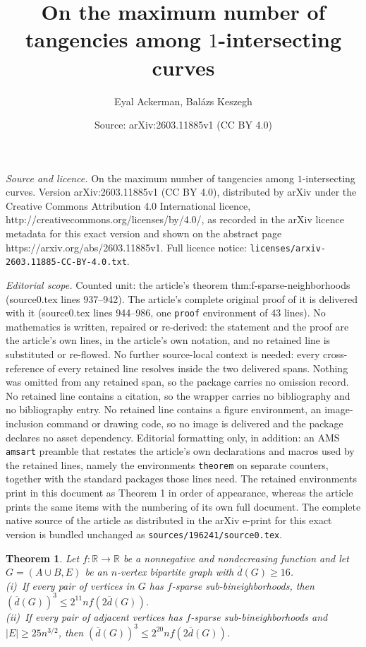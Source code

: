 \documentclass[10pt,a4paper]{amsart}
\title{On the maximum number of tangencies among $1$-intersecting curves}
\author{Eyal Ackerman, Bal\'azs Keszegh}
\date{Source: arXiv:2603.11885v1 (CC BY 4.0)}
\newtheorem{theorem}{Theorem}
\begin{document}
\maketitle

\noindent\emph{Source and licence.} On the maximum number of tangencies among $1$-intersecting curves. Version arXiv:2603.11885v1 (CC BY 4.0), distributed by arXiv under the Creative Commons Attribution 4.0 International licence, http://creativecommons.org/licenses/by/4.0/, as recorded in the arXiv licence metadata for this exact version and shown on the abstract page https://arxiv.org/abs/2603.11885v1. Full licence notice: \texttt{licenses/arxiv-2603.11885-CC-BY-4.0.txt}.\par\smallskip

\noindent\textit{Editorial scope.} Counted unit: the article's theorem thm:f-sparse-neighborhoods (source0.tex lines 937--942). The article's complete original proof of it is delivered with it (source0.tex lines 944--986, one \texttt{proof} environment of 43 lines). No mathematics is written, repaired or re-derived: the statement and the proof are the article's own lines, in the article's own notation, and no retained line is substituted or re-flowed.  No further source-local context is needed: every cross-reference of every retained line resolves inside the two delivered spans.  Nothing was omitted from any retained span, so the package carries no omission record.  No retained line contains a citation, so the wrapper carries no bibliography and no bibliography entry.  No retained line contains a figure environment, an image-inclusion command or drawing code, so no image is delivered and the package declares no asset dependency.  Editorial formatting only, in addition: an AMS \texttt{amsart} preamble that restates the article's own declarations and macros used by the retained lines, namely the environments \texttt{theorem} on separate counters, together with the standard packages those lines need.  The retained environments print in this document as Theorem 1 in order of appearance, whereas the article prints the same items with the numbering of its own full document.  The complete native source of the article as distributed in the arXiv e-print for this exact version is bundled unchanged as \texttt{sources/196241/source0.tex}.
\begin{theorem}
	\label{thm:f-sparse-neighborhoods}
	Let $f:\mathbb{R} \rightarrow \mathbb{R}$ be a nonnegative and nondecreasing function and let $G=(A \cup B,E)$ be an $n$-vertex bipartite graph with $\overline{d}(G) \ge 16$. \\
	(i)~If every pair of vertices in $G$ has $f$-sparse sub-bineighborhoods, then $(\overline{d}(G))^3 \le 2^{11}nf(2\overline{d}(G))$.\\
	(ii)~If every pair of adjacent vertices has $f$-sparse sub-bineighborhoods and $|E| \ge 25n^{3/2}$, then $(\overline{d}(G))^3 \le 2^{20}nf(2\overline{d}(G))$.
\end{theorem}
\end{document}
